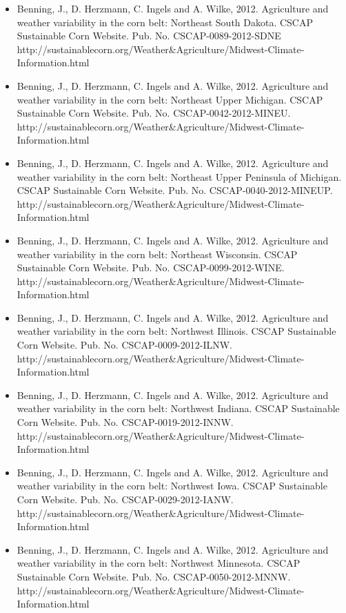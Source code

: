 \begin{itemize}
\item Benning, J., D. Herzmann, C. Ingels and A. Wilke, 2012. Agriculture and weather variability in the corn belt: Northeast South Dakota. CSCAP Sustainable Corn Website. Pub. No. CSCAP-0089-2012-SDNE http://sustainablecorn.org/Weather\&Agriculture/Midwest-Climate-Information.html

\item Benning, J., D. Herzmann, C. Ingels and A. Wilke, 2012. Agriculture and weather variability in the corn belt: Northeast Upper Michigan. CSCAP Sustainable Corn Website. Pub. No. CSCAP-0042-2012-MINEU. http://sustainablecorn.org/Weather\&Agriculture/Midwest-Climate-Information.html

\item Benning, J., D. Herzmann, C. Ingels and A. Wilke, 2012. Agriculture and weather variability in the corn belt: Northeast Upper Peninsula of Michigan. CSCAP Sustainable Corn Website. Pub. No. CSCAP-0040-2012-MINEUP. http://sustainablecorn.org/Weather\&Agriculture/Midwest-Climate-Information.html

\item Benning, J., D. Herzmann, C. Ingels and A. Wilke, 2012. Agriculture and weather variability in the corn belt: Northeast Wisconsin. CSCAP Sustainable Corn Website. Pub. No. CSCAP-0099-2012-WINE. http://sustainablecorn.org/Weather\&Agriculture/Midwest-Climate-Information.html

\item Benning, J., D. Herzmann, C. Ingels and A. Wilke, 2012. Agriculture and weather variability in the corn belt: Northwest Illinois. CSCAP Sustainable Corn Website. Pub. No. CSCAP-0009-2012-ILNW. http://sustainablecorn.org/Weather\&Agriculture/Midwest-Climate-Information.html

\item Benning, J., D. Herzmann, C. Ingels and A. Wilke, 2012. Agriculture and weather variability in the corn belt: Northwest Indiana. CSCAP Sustainable Corn Website. Pub. No. CSCAP-0019-2012-INNW. http://sustainablecorn.org/Weather\&Agriculture/Midwest-Climate-Information.html

\item Benning, J., D. Herzmann, C. Ingels and A. Wilke, 2012. Agriculture and weather variability in the corn belt: Northwest Iowa. CSCAP Sustainable Corn Website. Pub. No. CSCAP-0029-2012-IANW. http://sustainablecorn.org/Weather\&Agriculture/Midwest-Climate-Information.html

\item Benning, J., D. Herzmann, C. Ingels and A. Wilke, 2012. Agriculture and weather variability in the corn belt: Northwest Minnesota. CSCAP Sustainable Corn Website. Pub. No. CSCAP-0050-2012-MNNW. http://sustainablecorn.org/Weather\&Agriculture/Midwest-Climate-Information.html


\end{itemize}
